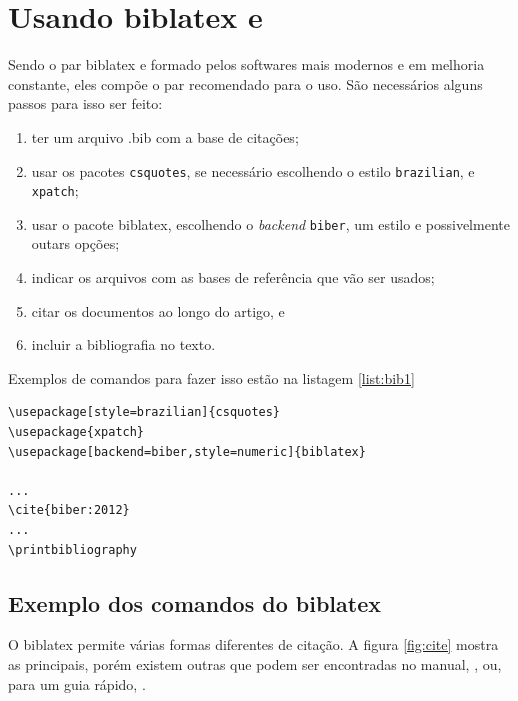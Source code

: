 \section{Usando biblatex e  }

Sendo o par biblatex e  formado pelos
softwares mais modernos e em melhoria constante, eles compõe
o par recomendado para o uso. São necessários alguns passos 
para isso ser feito:
\begin{enumerate}
    \item ter um arquivo .bib com a base de citações;
    \item usar os pacotes \lstinline|csquotes|, se necessário escolhendo o estilo \lstinline|brazilian|, e \lstinline|xpatch|;
    \item usar o pacote biblatex, escolhendo o \textit{backend} \lstinline|biber|, um estilo e possivelmente outars opções; 
    \item indicar os arquivos com as bases de referência que vão ser usados;
    \item citar os documentos ao longo do artigo, e
    \item incluir a bibliografia no texto.
\end{enumerate}
Exemplos de comandos para fazer isso estão na listagem \ref{list:bib1}

\begin{lstlisting}[caption=Exemplo de uso de biblatex,label=list:bib1]
\usepackage[style=brazilian]{csquotes}
\usepackage{xpatch}
\usepackage[backend=biber,style=numeric]{biblatex}

...
\cite{biber:2012}
...
\printbibliography
\end{lstlisting}



\subsection{Exemplo dos comandos do biblatex}

O biblatex permite várias formas diferentes de citação. A figura \ref{fig:cite} mostra as principais, porém existem outras que podem ser encontradas no manual, \parencite{Kime:2019}, ou, para um guia rápido, \autocite{Rees:2017}.

